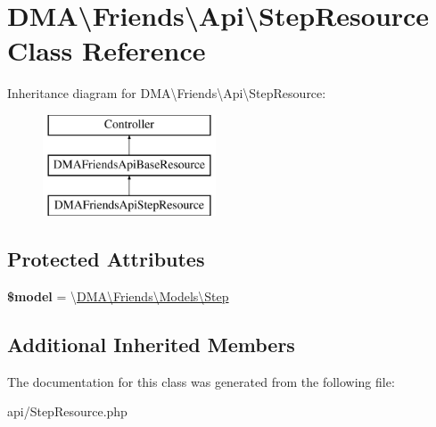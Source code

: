 \hypertarget{classDMA_1_1Friends_1_1Api_1_1StepResource}{}\section{D\+M\+A\textbackslash{}Friends\textbackslash{}Api\textbackslash{}Step\+Resource Class Reference}
\label{classDMA_1_1Friends_1_1Api_1_1StepResource}
Inheritance diagram for D\+M\+A\textbackslash{}Friends\textbackslash{}Api\textbackslash{}Step\+Resource\+:\begin{figure}[H]
\begin{center}
\leavevmode
\includegraphics[height=3.000000cm]{d8/da8/classDMA_1_1Friends_1_1Api_1_1StepResource}
\end{center}
\end{figure}
\subsection*{Protected Attributes}
\begin{DoxyCompactItemize}
\item 
\hypertarget{classDMA_1_1Friends_1_1Api_1_1StepResource_a96b8c504a8e7c87634d2d33873bb9ac3}{}{\bfseries \$model} = \textquotesingle{}\textbackslash{}\hyperlink{classDMA_1_1Friends_1_1Models_1_1Step}{D\+M\+A\textbackslash{}\+Friends\textbackslash{}\+Models\textbackslash{}\+Step}\textquotesingle{}\label{classDMA_1_1Friends_1_1Api_1_1StepResource_a96b8c504a8e7c87634d2d33873bb9ac3}

\end{DoxyCompactItemize}
\subsection*{Additional Inherited Members}


The documentation for this class was generated from the following file\+:\begin{DoxyCompactItemize}
\item 
api/Step\+Resource.\+php\end{DoxyCompactItemize}

